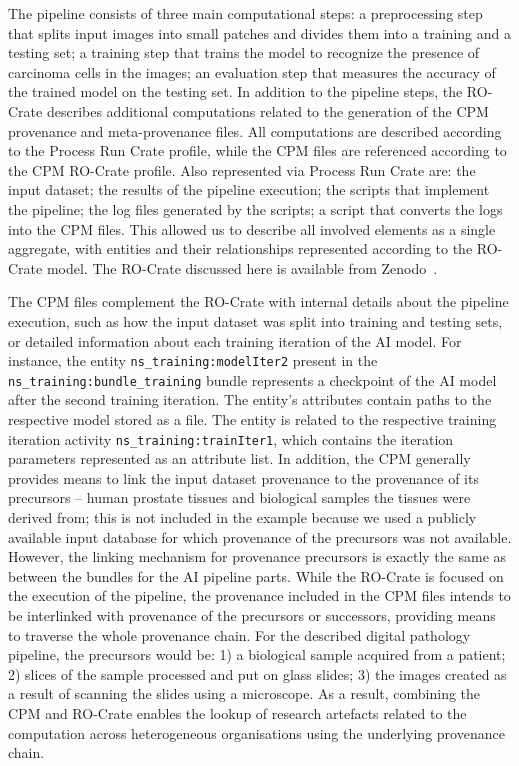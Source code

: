 The pipeline consists of three main computational steps: a preprocessing step that splits input images into small patches and divides them into a training and a testing set; a training step that trains the model to recognize the presence of carcinoma cells in the images; an evaluation step that measures the accuracy of the trained model on the testing set.
In addition to the pipeline steps, the RO-Crate describes additional computations related to the generation of the CPM provenance and meta-provenance files.
All computations are described according to the Process Run Crate profile, while the CPM files are referenced according to the CPM RO-Crate profile. 
Also represented via Process Run Crate are: the input dataset; the results of the pipeline execution; the scripts that implement the pipeline; the log files generated by the scripts; a script that converts the logs into the CPM files.
This allowed us to describe all involved elements as a single aggregate, with entities and their relationships represented according to the RO-Crate model.
The RO-Crate discussed here is available from Zenodo~\cite{Wittner 2023c}.

The CPM files complement the RO-Crate with internal details about the pipeline execution, such as how the input dataset was split into training and testing sets, or detailed information about each training iteration of the AI model.
For instance, the entity \texttt{ns\_training:modelIter2} present in the \texttt{ns\_training:bundle\_training} bundle represents a checkpoint of the AI model after the second training iteration.
The entity's attributes contain paths to the respective model stored as a file.
The entity is related to the respective training iteration activity \texttt{ns\_training:trainIter1}, which contains the iteration parameters represented as an attribute list.
In addition, the CPM generally provides means to link the input dataset provenance to the provenance of its precursors -- human prostate tissues and biological samples the tissues were derived from; this is not included in the example because we used a publicly available input database for which provenance of the precursors was not available.
However, the linking mechanism for provenance precursors is exactly the same as between the bundles for the AI pipeline parts.
While the RO-Crate is focused on the execution of the pipeline, the provenance included in the CPM files intends to be interlinked with provenance of the precursors or successors, providing means to traverse the whole provenance chain.
For the described digital pathology pipeline, the precursors would be: 1) a biological sample acquired from a patient; 2) slices of the sample processed and put on glass slides; 3) the images created as a result of scanning the slides using a microscope.
As a result, combining the CPM and RO-Crate enables the lookup of research artefacts related to the computation across heterogeneous organisations using the underlying provenance chain.

